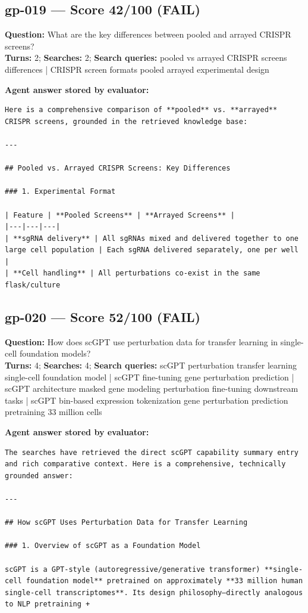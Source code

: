 \documentclass[12pt, a4paper]{article}
\begin{document}
\subsection*{gp-019 --- Score 42/100 (FAIL)}
\noindent\textbf{Question:} What are the key differences between pooled and arrayed CRISPR screens?\\
\textbf{Turns:} 2; \textbf{Searches:} 2; \textbf{Search queries:} pooled vs arrayed CRISPR screens differences | CRISPR screen formats pooled arrayed experimental design

\noindent\textbf{Agent answer stored by evaluator:}
\begin{lstlisting}[numbers=none]
Here is a comprehensive comparison of **pooled** vs. **arrayed** CRISPR screens, grounded in the retrieved knowledge base:

---

## Pooled vs. Arrayed CRISPR Screens: Key Differences

### 1. Experimental Format

| Feature | **Pooled Screens** | **Arrayed Screens** |
|---|---|---|
| **sgRNA delivery** | All sgRNAs mixed and delivered together to one large cell population | Each sgRNA delivered separately, one per well |
| **Cell handling** | All perturbations co-exist in the same flask/culture
\end{lstlisting}

\subsection*{gp-020 --- Score 52/100 (FAIL)}
\noindent\textbf{Question:} How does scGPT use perturbation data for transfer learning in single-cell foundation models?\\
\textbf{Turns:} 4; \textbf{Searches:} 4; \textbf{Search queries:} scGPT perturbation transfer learning single-cell foundation model | scGPT fine-tuning gene perturbation prediction | scGPT architecture masked gene modeling perturbation fine-tuning downstream tasks | scGPT bin-based expression tokenization gene perturbation prediction pretraining 33 million cells

\noindent\textbf{Agent answer stored by evaluator:}
\begin{lstlisting}[numbers=none]
The searches have retrieved the direct scGPT capability summary entry and rich comparative context. Here is a comprehensive, technically grounded answer:

---

## How scGPT Uses Perturbation Data for Transfer Learning

### 1. Overview of scGPT as a Foundation Model

scGPT is a GPT-style (autoregressive/generative transformer) **single-cell foundation model** pretrained on approximately **33 million human single-cell transcriptomes**. Its design philosophy—directly analogous to NLP pretraining + 
\end{lstlisting}
\end{document}
